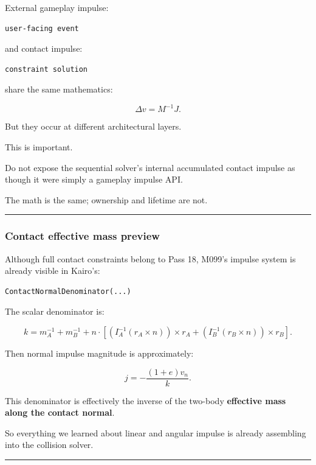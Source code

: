 External gameplay impulse:

\begin{verbatim}
user-facing event
\end{verbatim}

and contact impulse:

\begin{verbatim}
constraint solution
\end{verbatim}

share the same mathematics:

\[
\Delta v=M^{-1}J.
\]

But they occur at different architectural layers.

This is important.

Do not expose the sequential solver's internal accumulated contact impulse as though it were simply a gameplay impulse API.

The math is the same; ownership and lifetime are not.

\begin{center}\rule{0.5\linewidth}{0.5pt}\end{center}

\subsubsection{Contact effective mass preview}\label{contact-effective-mass-preview}

Although full contact constraints belong to Pass 18, M099's impulse system is already visible in Kairo's:

\begin{verbatim}
ContactNormalDenominator(...)
\end{verbatim}

The scalar denominator is:

\[
k
=
m_A^{-1}
+
m_B^{-1}
+
n\cdot
\left[
(I_A^{-1}(r_A\times n))\times r_A
+
(I_B^{-1}(r_B\times n))\times r_B
\right].
\]

Then normal impulse magnitude is approximately:

\[
\boxed{
j
=
-\frac{
(1+e)v_n
}{
k
}.
}
\]

This denominator is effectively the inverse of the two-body \textbf{effective mass along the contact normal}.

So everything we learned about linear and angular impulse is already assembling into the collision solver.

\begin{center}\rule{0.5\linewidth}{0.5pt}\end{center}


